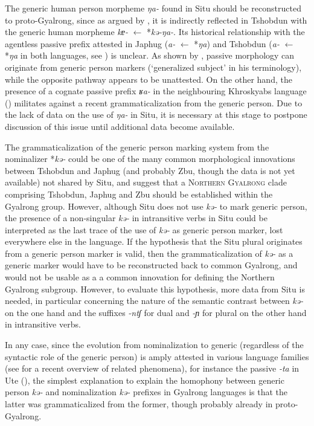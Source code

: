 \documentclass[oneside,a4paper,11pt]{article}
\newcommand{\ipa}[1]{\textit{\phon\mbox{#1}}} %
\begin{document}
The generic human person morpheme \ipa{ŋa-} found in Situ should be reconstructed to proto-Gyalrong, since as argued by  \citet[244]{sun14generic}, it is indirectly reflected in Tshobdun with the generic human morpheme \ipa{kɐ-} $\leftarrow$ *\ipa{kə-ŋa-}. Its historical relationship with the  agentless passive prefix attested in Japhug  (\ipa{a-} $\leftarrow$ *\ipa{ŋa}) and Tshobdun (\ipa{a-} $\leftarrow$ *\ipa{ŋa} in both languages, see \citealt{jacques12demotion}) is unclear. As shown by \citet[49-50]{haspelmath90passive}, passive morphology can originate from generic person markers (`generalized subject' in his terminology), while the opposite pathway appears to be unattested. On the other hand, the presence of a cognate passive prefix \ipa{ʁa-} in the neighbouring Khroskyabs language (\citealt[152-154]{lai13affixale}) militates against a recent grammaticalization from the generic person. Due to the lack of data on the use of \ipa{ŋa-} in Situ, it is necessary at this stage to postpone discussion of this issue until additional data become available.


The grammaticalization of the generic person marking system from the nominalizer *\ipa{kə-} could be one of the many common morphological innovations between Tshobdun and Japhug (and probably Zbu, though the data is not yet available) not shared by Situ, and suggest that a \textsc{Northern Gyalrong} clade comprising Tshobdun, Japhug and Zbu should be established within the Gyalrong group. However, although Situ does not use \ipa{kə-} to mark generic person,  the presence of a non-singular \ipa{kə-} in intransitive verbs in Situ could be interpreted as the last trace of the use of \ipa{kə-} as generic person marker, lost everywhere else in the language. If the hypothesis that the Situ plural originates from a generic person marker is valid, then the grammaticalization  of \ipa{kə-} as a generic marker would have to be reconstructed back to common Gyalrong, and would not be usable as a a common innovation for defining the Northern Gyalrong subgroup. However, to evaluate  this hypothesis, more data from Situ is needed, in particular concerning the nature of the semantic contrast between \ipa{kə-} on the one hand and the suffixes \ipa{-ntʃ} for dual and \ipa{-ɲ} for plural on the other hand in intransitive verbs.

In any case, since the evolution from nominalization to generic (regardless of the syntactic role of the generic person) is amply attested in various language families (see \citealt{sanso14nmlz} for a recent overview of related phenomena), for instance the passive \ipa{-ta} in Ute (\citealt[264-7]{givon11ute}), the simplest explanation to explain the homophony between generic person \ipa{kə-} and nominalization \ipa{kə-} prefixes in Gyalrong languages is that the latter was grammaticalized from the former, though probably already in proto-Gyalrong.
\end{document}

